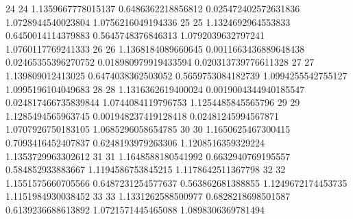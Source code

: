 {24 24 1.1359667778015137 0.6486362218856812 0.025472402572631836 1.0728944540023804 1.0756216049194336
25 25 1.1324692964553833 0.6450014114379883 0.5645748376846313 1.0792039632797241 1.0760117769241333
26 26 1.1368184089660645 0.0011663436889648438 0.02465355396270752 0.018980979919433594 0.020313739776611328
27 27 1.139809012413025 0.6474038362503052 0.5659753084182739 1.0994255542755127 1.0995196104049683
28 28 1.1316362619400024 0.0019004344940185547 0.024817466735839844 1.0744084119796753 1.1254485845565796
29 29 1.1285494565963745 0.001948237419128418 0.02481245994567871 1.0707926750183105 1.0685296058654785
30 30 1.1650625467300415 0.7093416452407837 0.6248193979263306 1.1208516359329224 1.1353729963302612
31 31 1.1648588180541992 0.6632940769195557 0.584852933883667 1.1194586753845215 1.1178642511367798
32 32 1.1551575660705566 0.6487231254577637 0.563862681388855 1.1249672174453735 1.1151984930038452
33 33 1.1331262588500977 0.6828218698501587 0.6139236688613892 1.0721571445465088 1.0898306369781494
}\tableexpiploadbetterxb
